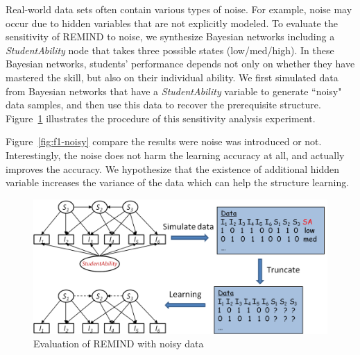\documentclass{edm_template}
\newcommand{\hl}[1]{\colorbox{yellow}{#1}}
\begin{document}
{	%
	Real-world data sets often contain various types of noise.
	For example,  noise may occur due to   hidden variables that are not explicitly modeled. 
	To evaluate the sensitivity of REMIND to noise, we synthesize Bayesian networks including a  \emph{StudentAbility} node that takes three possible states (low/med/high). 
	In these Bayesian networks, students' performance depends not only on whether they have mastered the skill, but also on their individual ability. %
	We first simulated data from  Bayesian networks that have a  \emph{StudentAbility} variable to generate ``noisy" data samples, and 
	then use this data to recover the prerequisite structure. %
	Figure~\ref{fig:stuabilitymodel} illustrates the procedure of this sensitivity analysis experiment.
	
	Figure~\ref{fig:f1-noisy} compare the results were noise was introduced or not.
	Interestingly, the noise does not harm the learning accuracy at all, and actually improves the accuracy.
	We hypothesize that the existence of additional hidden variable increases the variance of the data which can help the structure learning.
	
	\begin{figure}[!ht]
		\begin{center}
			\includegraphics[width=1.0\linewidth]{figures/studentability.png}
		\end{center}
		\caption{Evaluation of REMIND with noisy data} 
		\label{fig:stuabilitymodel}
	\end{figure}
	
}
\end{document}

